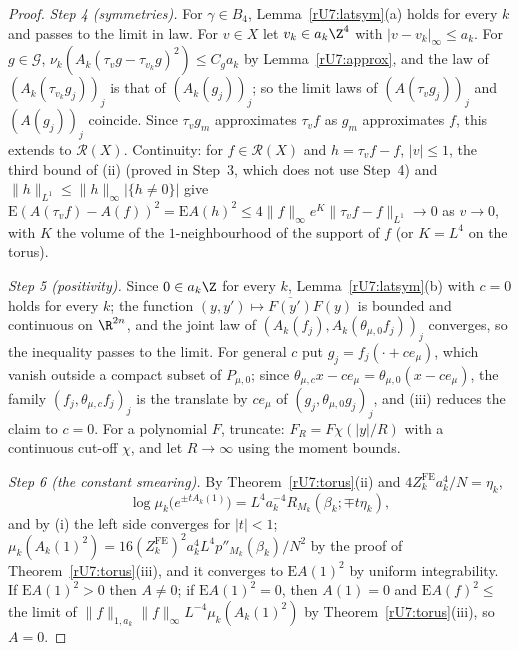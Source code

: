 \begin{proof}
\emph{Step 4 (symmetries).} For $\gamma\in B_4$, Lemma~\ref{rU7:latsym}(a)
holds for every $k$ and passes to the limit in law. For $v\in X$ let $v_k\in
a_k\Z^4$ with $|v-v_k|_\infty\le a_k$. For $g\in\mathcal G$,
$\nu_k(A_k(\tau_vg-\tau_{v_k}g)^2)\le C_ga_k$ by Lemma~\ref{rU7:approx}, and the
law of $(A_k(\tau_{v_k}g_j))_j$ is that of $(A_k(g_j))_j$; so the limit laws of
$(A(\tau_vg_j))_j$ and $(A(g_j))_j$ coincide. Since $\tau_vg_m$ approximates
$\tau_vf$ as $g_m$ approximates $f$, this extends to $\mathcal R(X)$. Continuity: for $f\in\mathcal R(X)$ and $h=\tau_vf-f$, $|v|\le1$, the third
bound of (ii) (proved in Step~3, which does not use Step~4) and
$\|h\|_{L^1}\le\|h\|_\infty|\{h\ne0\}|$ give $\mathrm E(A(\tau_vf)-A(f))^2=
\mathrm EA(h)^2\le4\|f\|_\infty e^{K}\|\tau_vf-f\|_{L^1}\to0$ as $v\to0$, with
$K$ the volume of the $1$-neighbourhood of the support of $f$ (or
$K=L^4$ on the torus).

\emph{Step 5 (positivity).} Since $0\in a_k\Z$ for every $k$,
Lemma~\ref{rU7:latsym}(b) with $c=0$ holds for every $k$; the function
$(y,y')\mapsto\overline{F(y')}F(y)$ is bounded and continuous on $\R^{2n}$, and
the joint law of $(A_k(f_j),A_k(\theta_{\mu,0}f_j))_j$ converges, so the
inequality passes to the limit. For general $c$ put $g_j=f_j(\cdot+ce_\mu)$,
which vanish outside a compact subset of $P_{\mu,0}$; since $\theta_{\mu,c}x-
ce_\mu=\theta_{\mu,0}(x-ce_\mu)$, the family $(f_j,\theta_{\mu,c}f_j)_j$ is the
translate by $ce_\mu$ of $(g_j,\theta_{\mu,0}g_j)_j$, and (iii) reduces the
claim to $c=0$. For a polynomial $F$, truncate: $F_R=F\chi(|y|/R)$ with a
continuous cut-off $\chi$, and let $R\to\infty$ using the moment bounds.

\emph{Step 6 (the constant smearing).} By Theorem~\ref{rU7:torus}(ii) and
$4Z_k^{\mathrm{FE}}a_k^4/N=\eta_k$,
\[
\log\mu_k\bigl(e^{\pm tA_k(1)}\bigr)=L^4a_k^{-4}R_{M_k}(\beta_k;\mp t\eta_k),
\]
and by (i)
the left side converges for $|t|<1$; $\mu_k(A_k(1)^2)=16(Z^{\mathrm{FE}}_k)^2
a_k^4L^4p''_{M_k}(\beta_k)/N^2$ by the proof of Theorem~\ref{rU7:torus}(iii),
and it converges to $\mathrm EA(1)^2$ by uniform integrability. If
$\mathrm EA(1)^2>0$ then $A\ne0$; if $\mathrm EA(1)^2=0$, then $A(1)=0$
and $\mathrm EA(f)^2\le$ the limit of
$\|f\|_{1,a_k}\|f\|_\infty L^{-4}\mu_k(A_k(1)^2)$ by
Theorem~\ref{rU7:torus}(iii), so $A=0$.
\end{proof}

